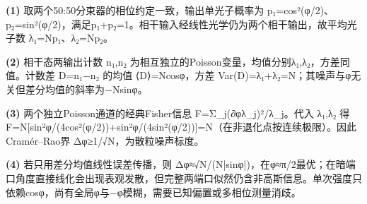 \par\noindent\textbf{(1)} 取两个50:50分束器的相位约定一致，输出单光子概率为 p₁=cos²(φ/2)、p₂=sin²(φ/2)，满足p₁+p₂=1。相干输入经线性光学仍为两个相干输出，故平均光子数 λ₁=Np₁、λ₂=Np₂。
\par\noindent\textbf{(2)} 相干态两输出计数 n₁,n₂ 为相互独立的Poisson变量，均值分别λ₁,λ₂，方差同值。计数差 D=n₁−n₂ 的均值 ⟨D⟩=Ncosφ，方差 Var(D)=λ₁+λ₂=N；其噪声与φ无关但差分均值的斜率为−Nsinφ。
\par\noindent\textbf{(3)} 两个独立Poisson通道的经典Fisher信息 F=Σ\_j(∂φλ\_j)²/λ\_j。代入 λ₁,λ₂ 得 F=N[sin²φ/(4cos²(φ/2))+sin²φ/(4sin²(φ/2))]=N（在非退化点按连续极限）。因此Cramér–Rao界 Δφ≥1/√N，为散粒噪声标度。
\par\noindent\textbf{(4)} 若只用差分均值线性误差传播，则 Δφ≈√N/(N|sinφ|)，在φ≈π/2最优；在暗端口角度直接线化会出现表观发散，但完整两端口似然仍含非高斯信息。单次强度只依赖cosφ，尚有全局φ与−φ模糊，需要已知偏置或多相位测量消歧。
